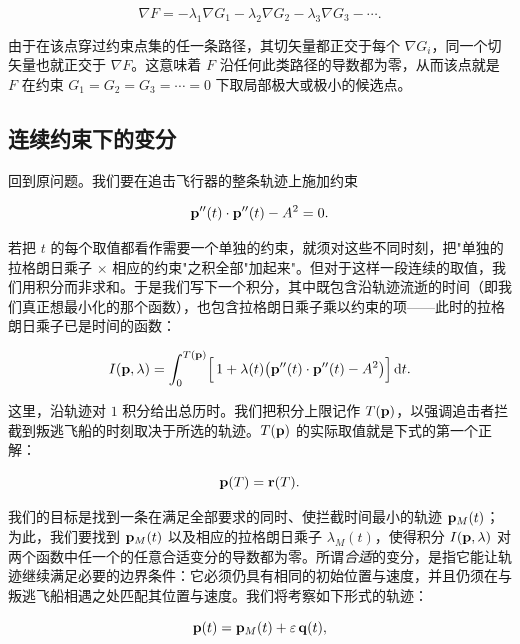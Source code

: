 \begin{equation}
\nabla F = -\lambda_{1}\nabla G_{1} - \lambda_{2}\nabla G_{2} - \lambda_{3}\nabla G_{3} - \cdots .
\end{equation}

由于在该点穿过约束点集的任一条路径，其切矢量都正交于每个 $\nabla G_i$，同一个切矢量也就正交于 $\nabla F$。这意味着 $F$ 沿任何此类路径的导数都为零，从而该点就是 $F$ 在约束 $G_1=G_2=G_3=\cdots=0$ 下取局部极大或极小的候选点。

\subsection{连续约束下的变分}

回到原问题。我们要在追击飞行器的整条轨迹上施加约束

\begin{equation}
\mathbf{p}''(t)\cdot\mathbf{p}''(t)-A^{2}=0 .
\end{equation}

若把 $t$ 的每个取值都看作需要一个单独的约束，就须对这些不同时刻，把"单独的拉格朗日乘子 $\times$ 相应的约束"之积全部"加起来"。但对于这样一段连续的取值，我们用积分而非求和。于是我们写下一个积分，其中既包含沿轨迹流逝的时间（即我们真正想最小化的那个函数），也包含拉格朗日乘子乘以约束的项——此时的拉格朗日乘子已是时间的函数：

\begin{equation}
I(\mathbf{p},\lambda)=\int_{0}^{T(\mathbf{p})}\Bigl[\,1+\lambda(t)\bigl(\mathbf{p}''(t)\cdot\mathbf{p}''(t)-A^{2}\bigr)\Bigr]\,\mathrm{d} t .
\end{equation}

这里，沿轨迹对 $1$ 积分给出总历时。我们把积分上限记作 $T(\mathbf{p})$，以强调追击者拦截到叛逃飞船的时刻取决于所选的轨迹。$T(\mathbf{p})$ 的实际取值就是下式的第一个正解：

\begin{equation}
\mathbf{p}(T)=\mathbf{r}(T).
\end{equation}

我们的目标是找到一条在满足全部要求的同时、使拦截时间最小的轨迹 $\mathbf{p}_M(t)$；为此，我们要找到 $\mathbf{p}_M(t)$ 以及相应的拉格朗日乘子 $\lambda_M(t)$，使得积分 $I(\mathbf{p},\lambda)$ 对两个函数中任一个的任意合适变分的导数都为零。所谓\emph{合适}的变分，是指它能让轨迹继续满足必要的边界条件：它必须仍具有相同的初始位置与速度，并且仍须在与叛逃飞船相遇之处匹配其位置与速度。我们将考察如下形式的轨迹：

\begin{equation}
\mathbf{p}(t)=\mathbf{p}_M(t)+\varepsilon\,\mathbf{q}(t),
\end{equation}

